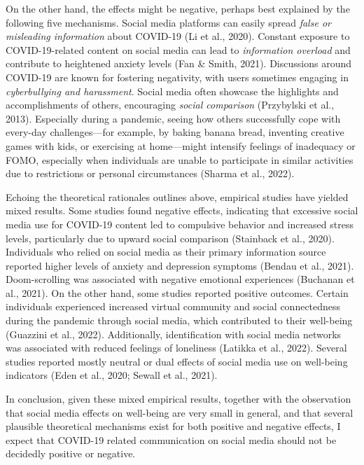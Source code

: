 \documentclass[
  man,mask,floatsintext]{apa7}
\begin{document}
On the other hand, the effects might be negative, perhaps best explained by the following five mechanisms.
Social media platforms can easily spread \emph{false or misleading information} about COVID-19 (Li et al., 2020).
Constant exposure to COVID-19-related content on social media can lead to \emph{information overload} and contribute to heightened anxiety levels (Fan \& Smith, 2021).
Discussions around COVID-19 are known for fostering negativity, with users sometimes engaging in \emph{cyberbullying and harassment}.
Social media often showcase the highlights and accomplishments of others, encouraging \emph{social comparison} (Przybylski et al., 2013).
Especially during a pandemic, seeing how others successfully cope with every-day challenges---for example, by baking banana bread, inventing creative games with kids, or exercising at home---might intensify feelings of inadequacy or FOMO, especially when individuals are unable to participate in similar activities due to restrictions or personal circumstances (Sharma et al., 2022).

Echoing the theoretical rationales outlines above, empirical studies have yielded mixed results.
Some studies found negative effects, indicating that excessive social media use for COVID-19 content led to compulsive behavior and increased stress levels, particularly due to upward social comparison (Stainback et al., 2020).
Individuals who relied on social media as their primary information source reported higher levels of anxiety and depression symptoms (Bendau et al., 2021).
Doom-scrolling was associated with negative emotional experiences (Buchanan et al., 2021).
On the other hand, some studies reported positive outcomes.
Certain individuals experienced increased virtual community and social connectedness during the pandemic through social media, which contributed to their well-being (Guazzini et al., 2022).
Additionally, identification with social media networks was associated with reduced feelings of loneliness (Latikka et al., 2022).
Several studies reported mostly neutral or dual effects of social media use on well-being indicators (Eden et al., 2020; Sewall et al., 2021).

In conclusion, given these mixed empirical results, together with the observation that social media effects on well-being are very small in general, and that several plausible theoretical mechanisms exist for both positive and negative effects, I expect that COVID-19 related communication on social media should not be decidedly positive or negative.
\end{document}
